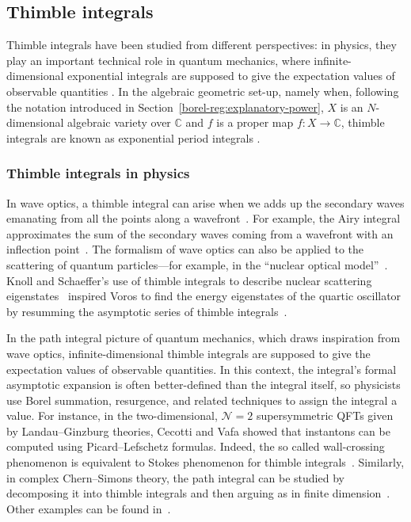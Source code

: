 \documentclass{article}
\newcommand{\C}{\mathbb{C}}
\theoremstyle{definition}
\theoremstyle{plain}
\begin{document}
\subsection{Thimble integrals}
%
Thimble integrals have been studied from different perspectives: in physics, they play an important technical role in quantum mechanics, where infinite-dimensional exponential integrals are supposed to give the expectation values of observable quantities \cite{dunne-unsal2,dunne-unsal,Fauvet_Menous_Queva,Tanizaki:2014tua}. In the algebraic geometric set-up, namely when, following the notation introduced in Section~\ref{borel-reg:explanatory-power}, $X$ is an $N$-dimensional algebraic variety over $\C$ and $f$ is a proper map $f\colon X\to\C$, thimble integrals are known as exponential period integrals \cite{deligne2007singularites,Maxim_lectures}.
\subsubsection{Thimble integrals in physics}
In wave optics, a thimble integral can arise when we adds up the secondary waves emanating from all the points along a wavefront~\cite{Fenyes-ihes-lecture}. For example, the Airy integral approximates the sum of the secondary waves coming from a wavefront with an inflection point~\cite{rainbows+glories}. The formalism of wave optics can also be applied to the scattering of quantum particles---for example, in the ``nuclear optical model''~\cite{nuclear-optical, nuclear-mie}. Knoll and Schaeffer's use of thimble integrals to describe nuclear scattering eigenstates~\cite{semiclass-scat} inspired Voros to find the energy eigenstates of the quartic oscillator by resumming the asymptotic series of thimble integrals~\cite{quartic-return}. 

In the path integral picture of quantum mechanics, which draws inspiration from wave optics, infinite-dimensional thimble integrals are supposed to give the expectation values of observable quantities. In this context, the integral's formal asymptotic expansion is often better-defined than the integral itself, so physicists use Borel summation, resurgence, and related techniques to assign the integral a value. For instance, in the two-dimensional, $\mathcal{N}=2$ supersymmetric QFTs given by Landau--Ginzburg theories, Cecotti and Vafa showed that instantons can be computed using Picard--Lefschetz formulas. Indeed, the so called wall-crossing phenomenon is equivalent to Stokes phenomenon for thimble integrals~\cite{Cecotti:1992rm}. Similarly, in complex Chern--Simons theory, the path integral can be studied by decomposing it into thimble integrals and then arguing as in finite dimension~\cite{gukov-marino-purtrov-resurgence,Witten}. Other examples can be found in~\cite{costin_kruskal,Garoufalidis--CS,GTM--CS,GGM,dunne-unsal2,dunne-unsal,Fauvet_Menous_Queva,Tanizaki:2014tua,Berry_Howls,Berry1991,Howls97,Howls,pham1988resurgence,Unsal--resurgence-gauge}.
%
\end{document}
